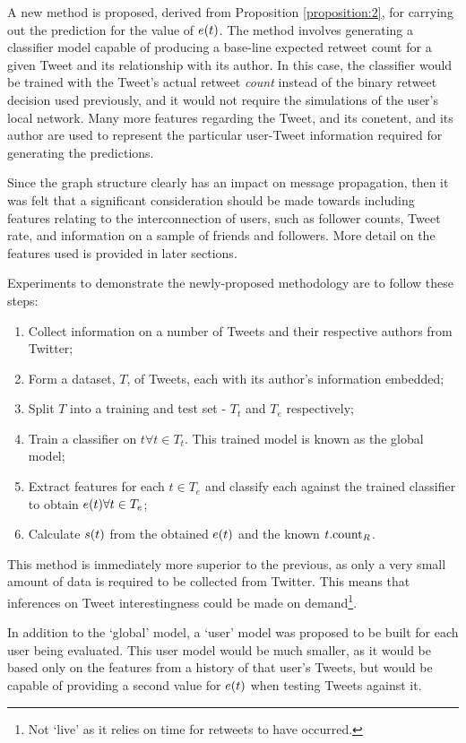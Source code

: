A new method is proposed, derived from Proposition \ref{proposition:2}, for carrying out the prediction for the value of $e(t)$. The method involves generating a classifier model capable of producing a base-line expected retweet count for a given Tweet and its relationship with its author. In this case, the classifier would be trained with the Tweet's actual retweet \textit{count} instead of the binary retweet decision used previously, and it would not require the simulations of the user's local network. Many more features regarding the Tweet, and its conetent, and its author are used to represent the particular user-Tweet information required for generating the predictions.

Since the graph structure clearly has an impact on message propagation, then it was felt that a significant consideration should be made towards including features relating to the interconnection of users, such as follower counts, Tweet rate, and information on a sample of friends and followers. More detail on the features used is provided in later sections.

Experiments to demonstrate the newly-proposed methodology are to follow these steps:
\begin{enumerate}
    \item Collect information on a number of Tweets and their respective authors from Twitter;
    \item Form a dataset, $T$, of Tweets, each with its author's information embedded;
    \item Split $T$ into a training and test set - $T_t$ and $T_e$ respectively;
    \item Train a classifier on $t \forall t \in T_t$. This trained model is known as the global model;
    \item Extract features for each $t \in T_e$ and classify each against the trained classifier to obtain $e(t) \forall t \in T_e$;
    \item Calculate $s(t)$ from the obtained $e(t)$ and the known $t.\textrm{count}_R$. 
\end{enumerate}

This method is immediately more superior to the previous, as only a very small amount of data is required to be collected from Twitter. This means that inferences on Tweet interestingness could be made on demand\footnote{Not `live' as it relies on time for retweets to have occurred.}.

In addition to the `global' model, a `user' model was proposed to be built for each user being evaluated. This user model would be much smaller, as it would be based only on the features from a history of that user's Tweets, but would be capable of providing a second value for $e(t)$ when testing Tweets against it. 


